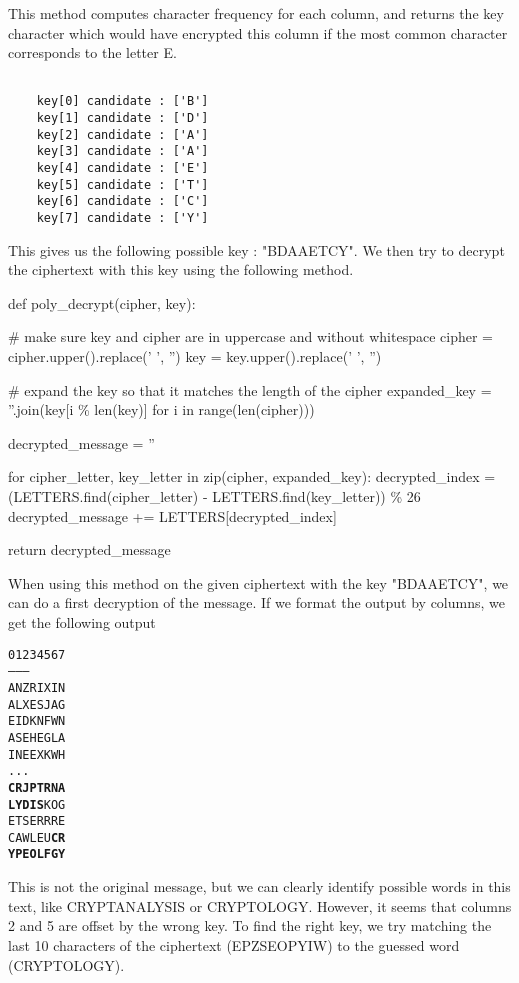 \documentclass{article}
\begin{document}
This method computes character frequency for each column, and returns the key character which would have encrypted this column if the most common character corresponds to the letter E.

\begin{verbatim}

    key[0] candidate : ['B']
    key[1] candidate : ['D']
    key[2] candidate : ['A']
    key[3] candidate : ['A']
    key[4] candidate : ['E']
    key[5] candidate : ['T']
    key[6] candidate : ['C']
    key[7] candidate : ['Y']

\end{verbatim}

This gives us the following possible key : "BDAAETCY". We then try to decrypt the ciphertext with this key using the following method.

\bigskip
\begin{python}
def poly_decrypt(cipher, key):

    # make sure key and cipher are in uppercase and without whitespace
    cipher = cipher.upper().replace(' ', '')
    key = key.upper().replace(' ', '')

    # expand the key so that it matches the length of the cipher
    expanded_key = ''.join(key[i \% len(key)] for i in range(len(cipher)))

    decrypted_message = ''

    for cipher_letter, key_letter in zip(cipher, expanded_key):
        decrypted_index = (LETTERS.find(cipher_letter) - LETTERS.find(key_letter)) \% 26
        decrypted_message += LETTERS[decrypted_index]

    return decrypted_message
\end{python}
\bigskip

When using this method on the given ciphertext with the key "BDAAETCY", we can do a first decryption of the message. If we format the output by columns, we get the following output

\begin{alltt}
    01234567
    --------
    ANZRIXIN
    ALXESJAG
    EIDKNFWN
    ASEHEGLA
    INEEXKWH
    ...
    \textbf{CRJPTRNA}
    \textbf{LYDIS}KOG
    ETSERRRE
    CAWLEU\textbf{CR}
    \textbf{YPEOLFGY}
\end{alltt}
    
This is not the original message, but we can clearly identify possible words in this text, like CRYPTANALYSIS or CRYPTOLOGY. However, it seems that columns 2 and 5 are offset by the wrong key. To find the right key, we try matching the last 10 characters of the ciphertext (EPZSEOPYIW) to the guessed word (CRYPTOLOGY). 
\end{document}

